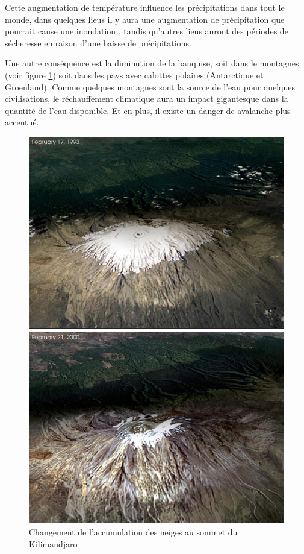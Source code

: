 \documentclass[a4paper,11pt]{article}
\begin{document}
Cette  augmentation de température  influence les  précipitations dans  tout le
monde,  dans quelques  lieus il  y aura  une augmentation  de  précipitation que
pourrait cause  une inondation , tandis  qu'autres lieus auront  des périodes de
sécheresse en raison d'une baisse de précipitations.

Une autre conséquence  est la diminution de la banquise,  soit dans le montagnes
(voir figure \ref{fig:kili}) soit dans les pays avec calottes polaires (Antarctique et Groenland).
Comme quelques montagnes sont la source de l'eau pour quelques civilisations, le
réchauffement climatique  aura un impact  gigantesque dans la quantité  de l'eau
disponible. Et en plus, il existe un danger de avalanche plus accentué.

\begin{figure}[H]
  \begin{centering}
    \includegraphics[scale=0.3]{fig/kili}
    \par\end{centering}
  \caption{Changement de l'accumulation des neiges au sommet du Kilimandjaro}
  \label{fig:kili}
\end{figure}
\end{document}
